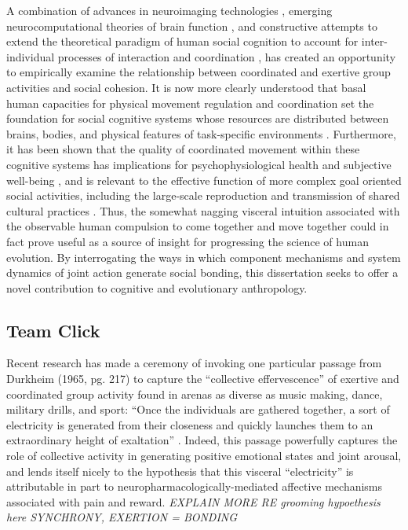 A combination of advances in neuroimaging technologies \citep{Frith2007}, emerging neurocomputational theories of brain function \citep{Friston2010,Frith2010,Clark2013}, and constructive attempts to extend the theoretical paradigm of human social cognition to account for inter-individual processes of interaction and coordination \citep{Sebanz2006,Dale2014}, has created an opportunity to empirically examine the relationship between coordinated and exertive group activities and social cohesion.  It is now more clearly understood that basal human capacities for physical movement regulation and coordination set the foundation for social cognitive systems whose resources are distributed between brains, bodies, and physical features of task-specific environments \citep{Hutchins2000,Kirsh2006,Semin2008,Semin2012,Coey2012}.  Furthermore, it has been shown that the quality of coordinated movement within these cognitive systems has implications for psychophysiological health and subjective well-being \citep{Wheatley2012}, and is relevant to the effective function of more complex goal oriented social activities, including the large-scale reproduction and transmission of shared cultural practices \citep{Dunbar2012,Roepstorff2010,Claidiere2014,Launay2016}. Thus, the somewhat nagging visceral intuition associated with the observable human compulsion to come together and move together could in fact prove useful as a source of insight for progressing the science of human evolution.  By interrogating the ways in which component mechanisms and system dynamics of joint action generate social bonding, this dissertation seeks to offer a novel contribution to cognitive and evolutionary anthropology.




\subsection{Team Click}
Recent research has made a ceremony of invoking one particular passage from Durkheim (1965, pg. 217) to capture the ``collective effervescence'' of exertive and coordinated group activity found in arenas as diverse as music making, dance, military drills, and sport:  ``Once the individuals are gathered together, a sort of electricity is generated from their closeness and quickly launches them to an extraordinary height of exaltation'' \citep{McNeill1995,Konvalinka2011,Fischer2014,Mogan2017}. Indeed, this passage powerfully captures the role of collective activity in generating positive emotional states and joint arousal, and lends itself nicely to the hypothesis that this visceral ``electricity'' is attributable in part to neuropharmacologically-mediated affective mechanisms associated with pain and reward\citep{Dunbar2008,Cohen2009,Fischer2014,Launay2016}.   \textit{EXPLAIN MORE RE grooming hypoethesis here  SYNCHRONY, EXERTION = BONDING}


